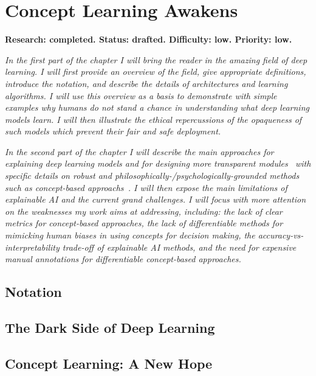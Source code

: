 \documentclass[withindex,glossary]{cam-thesis}
\begin{document}
\chapter{Concept Learning Awakens} \label{chapter:background}
\textbf{Research: completed. Status: drafted. Difficulty: low. Priority: low.}

\textit{In the first part of the chapter I will bring the reader in the amazing field of deep learning. I will first provide an overview of the field, give appropriate definitions, introduce the notation, and describe the details of architectures and learning algorithms. I will use this overview as a basis to demonstrate with simple examples why humans do not stand a chance in understanding what deep learning models learn. I will then illustrate the ethical repercussions of the opaqueness of such models which prevent their fair and safe deployment.}

\textit{In the second part of the chapter I will describe the main approaches for explaining deep learning models and for designing more transparent modules~\citep{duran2021afraid,lo2020ethical,wachter2017counterfactual,gdpr2017,rudin2019stop} with specific details on robust and philosophically-/psychologically-grounded methods such as concept-based approachs~\citep{ghorbani2019towards,kim2018interpretability,shen2022trust}. I will then expose the main limitations of explainable AI and the current grand challenges. I will focus with more attention on the weaknesses my work aims at addressing, including: the lack of clear metrics for concept-based approaches, the lack of differentiable methods for mimicking human biases in using concepts for decision making, the accuracy-vs-interpretability trade-off of explainable AI methods, and the need for expensive manual annotations for differentiable concept-based approaches.}

\section{Notation}

\section{The Dark Side of Deep Learning}

\section{Concept Learning: A New Hope}
\end{document}
